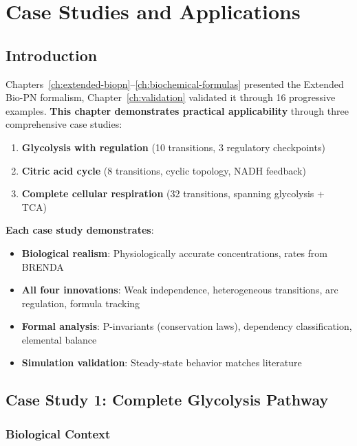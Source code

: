 \chapter{Case Studies and Applications}
\label{ch:case-studies}

\section{Introduction}
\label{sec:case-studies-intro}

Chapters~\ref{ch:extended-biopn}--\ref{ch:biochemical-formulas} presented the Extended Bio-PN formalism, Chapter~\ref{ch:validation} validated it through 16 progressive examples. \textbf{This chapter demonstrates practical applicability} through three comprehensive case studies:

\begin{enumerate}
    \item \textbf{Glycolysis with regulation} (10 transitions, 3 regulatory checkpoints)
    \item \textbf{Citric acid cycle} (8 transitions, cyclic topology, NADH feedback)
    \item \textbf{Complete cellular respiration} (32 transitions, spanning glycolysis + TCA)
\end{enumerate}

\textbf{Each case study demonstrates}:

\begin{itemize}
    \item \textbf{Biological realism}: Physiologically accurate concentrations, rates from BRENDA
    \item \textbf{All four innovations}: Weak independence, heterogeneous transitions, arc regulation, formula tracking
    \item \textbf{Formal analysis}: P-invariants (conservation laws), dependency classification, elemental balance
    \item \textbf{Simulation validation}: Steady-state behavior matches literature
\end{itemize}

\section{Case Study 1: Complete Glycolysis Pathway}
\label{sec:case-study-glycolysis}

\subsection{Biological Context}
\label{subsec:glycolysis-context}

